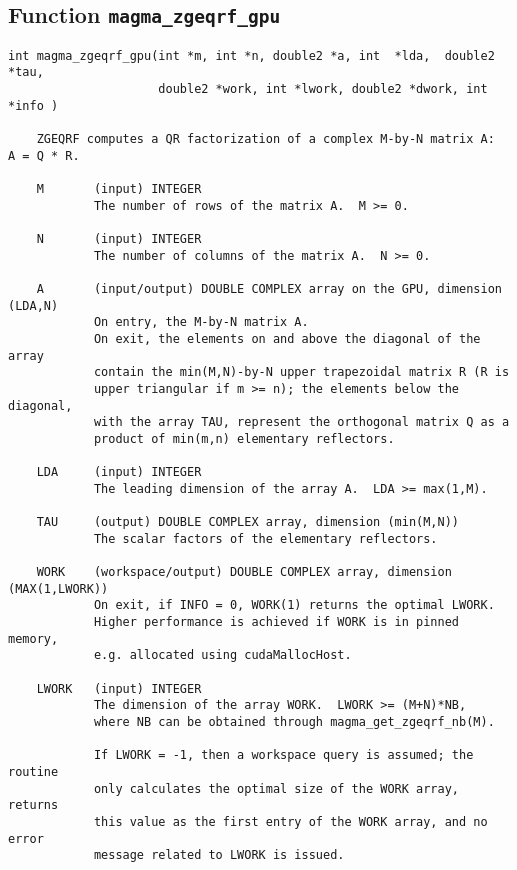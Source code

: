\documentclass[10pt]{book}
\begin{document}
\newpage
\subsection{Function {\tt {\bf magma\_zgeqrf\_gpu}}}
\begin{verbatim}
int magma_zgeqrf_gpu(int *m, int *n, double2 *a, int  *lda,  double2  *tau,
                     double2 *work, int *lwork, double2 *dwork, int *info )
   
    ZGEQRF computes a QR factorization of a complex M-by-N matrix A:  A = Q * R.   

    M       (input) INTEGER   
            The number of rows of the matrix A.  M >= 0.   

    N       (input) INTEGER   
            The number of columns of the matrix A.  N >= 0.   

    A       (input/output) DOUBLE COMPLEX array on the GPU, dimension (LDA,N)   
            On entry, the M-by-N matrix A.   
            On exit, the elements on and above the diagonal of the array   
            contain the min(M,N)-by-N upper trapezoidal matrix R (R is   
            upper triangular if m >= n); the elements below the diagonal,   
            with the array TAU, represent the orthogonal matrix Q as a   
            product of min(m,n) elementary reflectors.

    LDA     (input) INTEGER   
            The leading dimension of the array A.  LDA >= max(1,M).   

    TAU     (output) DOUBLE COMPLEX array, dimension (min(M,N))   
            The scalar factors of the elementary reflectors.   

    WORK    (workspace/output) DOUBLE COMPLEX array, dimension (MAX(1,LWORK))   
            On exit, if INFO = 0, WORK(1) returns the optimal LWORK.   
            Higher performance is achieved if WORK is in pinned memory, 
            e.g. allocated using cudaMallocHost.

    LWORK   (input) INTEGER   
            The dimension of the array WORK.  LWORK >= (M+N)*NB,   
            where NB can be obtained through magma_get_zgeqrf_nb(M).

            If LWORK = -1, then a workspace query is assumed; the routine   
            only calculates the optimal size of the WORK array, returns   
            this value as the first entry of the WORK array, and no error   
            message related to LWORK is issued.   


\end{verbatim}
\end{document}

